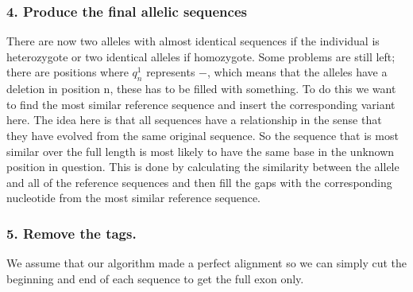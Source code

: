 \subsubsection{4. Produce the final allelic sequences}

There are now two alleles with almost identical sequences if the individual is heterozygote or two identical alleles if homozygote. Some problems are still left; there are positions where $q_n^1$ represents $-$, which means that the alleles have a deletion in position n, these has to be filled with something. To do this we want to find the most similar reference sequence and insert the corresponding variant here. The idea here is that all sequences have a relationship in the sense that they have evolved from the same original sequence. So the sequence that is most similar over the full length is most likely to have the same base in the unknown position in question. This is done by calculating the similarity between the allele and all of the reference sequences and then fill the gaps with the corresponding nucleotide from the most similar reference sequence.

\subsubsection{5. Remove the tags.}
We assume that our algorithm made a perfect alignment so we can simply cut the beginning and end of each sequence to get the full exon only.
